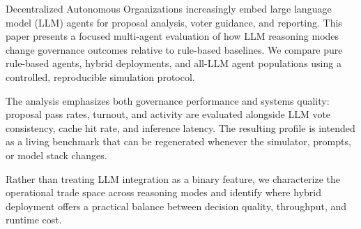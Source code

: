 
Decentralized Autonomous Organizations increasingly embed large language model (LLM)
agents for proposal analysis, voter guidance, and reporting. This paper presents a
focused multi-agent evaluation of how LLM reasoning modes change governance outcomes
relative to rule-based baselines. We compare pure rule-based agents, hybrid
deployments, and all-LLM agent populations using a controlled, reproducible
simulation protocol.

The analysis emphasizes both governance performance and systems quality: proposal pass
rates, turnout, and activity are evaluated alongside LLM vote consistency, cache hit
rate, and inference latency. The resulting profile is intended as a living benchmark
that can be regenerated whenever the simulator, prompts, or model stack changes.

Rather than treating LLM integration as a binary feature, we characterize the
operational trade space across reasoning modes and identify where hybrid deployment
offers a practical balance between decision quality, throughput, and runtime cost.

